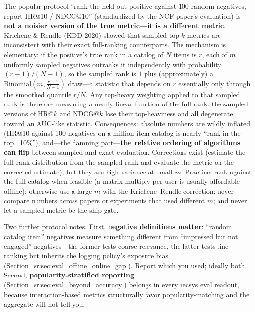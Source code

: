 \begin{warningbox}
The popular protocol ``rank the held-out positive against 100 random negatives, report HR@10 / NDCG@10'' (standardized by the NCF paper's evaluation) is \textbf{not a noisier version of the true metric---it is a different metric}. Krichene \& Rendle (KDD 2020) showed that sampled top-$k$ metrics are inconsistent with their exact full-ranking counterparts. The mechanism is elementary: if the positive's true rank in a catalog of $N$ items is $r$, each of $m$ uniformly sampled negatives outranks it independently with probability $(r-1)/(N-1)$, so the sampled rank is $1$ plus (approximately) a $\mathrm{Binomial}\!\left(m, \frac{r-1}{N-1}\right)$ draw---a statistic that depends on $r$ essentially only through the smoothed quantile $r/N$. Any top-heavy weighting applied to that sampled rank is therefore measuring a nearly linear function of the full rank: the sampled versions of HR@$k$ and NDCG@$k$ lose their top-heaviness and all degenerate toward an AUC-like statistic. Consequences: absolute numbers are wildly inflated (HR@10 against 100 negatives on a million-item catalog is nearly ``rank in the top ~10\%''), and---the damning part---\textbf{the relative ordering of algorithms can flip} between sampled and exact evaluation. Corrections exist (estimate the full-rank distribution from the sampled rank and evaluate the metric on the corrected estimate), but they are high-variance at small $m$. Practice: rank against the full catalog when feasible (a matrix multiply per user is usually affordable offline); otherwise use a large $m$ with the Krichene--Rendle correction; never compare numbers across papers or experiments that used different $m$; and never let a sampled metric be the ship gate.
\end{warningbox}

Two further protocol notes. First, \textbf{negative definitions matter}: ``random catalog item'' negatives measure something different from ``impressed but not engaged'' negatives---the former tests coarse relevance, the latter tests fine ranking but inherits the logging policy's exposure bias (Section~\ref{sr:sec:eval_offline_online_gap}). Report which you used; ideally both. Second, \textbf{popularity-stratified reporting} (Section~\ref{sr:sec:eval_beyond_accuracy}) belongs in every recsys eval readout, because interaction-based metrics structurally favor popularity-matching and the aggregate will not tell you.

